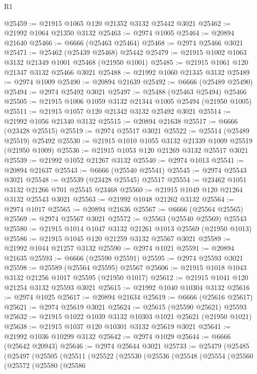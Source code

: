 \begin{lexlean}{R1}
\begin{coremodule}
@25459 := @21915 @1065 @120 @21352 @3132 @25442 @3021
@25462 := @21992 @1064 @21350 @3132
@25463 := @2974 @1005
@25464 := @20894 @21640
@25466 := @6666 (@25463 @25464)
@25468 := @2974 @25466 @3021
@25471 := @25462 (@25439 @25468) @25442
@25479 := @21915 @1002 @1063 @3132 @21349 @1001 @25468 (@21950 @1001)
@25485 := @21915 @1061 @120 @21347 @3132 @25466 @3021
@25488 := @21992 @1060 @21345 @3132
@25489 := @2974 @1009
@25490 := @20894 @21639
@25492 := @6666 (@25489 @25490)
@25494 := @2974 @25492 @3021
@25497 := @25488 (@25463 @25494) @25466
@25505 := @21915 @1006 @1059 @3132 @21344 @1005 @25494 (@21950 @1005)
@25511 := @21915 @1057 @120 @21342 @3132 @25492 @3021
@25514 := @21992 @1056 @21340 @3132
@25515 := @20894 @21638
@25517 := @6666 (@23428 @25515)
@25519 := @2974 @25517 @3021
@25522 := @25514 (@25489 @25519) @25492
@25530 := @21915 @1010 @1055 @3132 @21339 @1009 @25519 (@21950 @1009)
@25536 := @21915 @1053 @120 @21269 @3132 @25517 @3021
@25539 := @21992 @1052 @21267 @3132
@25540 := @2974 @1013
@25541 := @20894 @21637
@25543 := @6666 (@25540 @25541)
@25545 := @2974 @25543 @3021
@25548 := @25539 (@23428 @25545) @25517
@25554 := @23462 @1051 @3132 @21266 @701 @25545 @23468
@25560 := @21915 @1049 @120 @21264 @3132 @25543 @3021
@25563 := @21992 @1048 @21262 @3132
@25564 := @2974 @1017
@25565 := @20894 @21636
@25567 := @6666 (@25564 @25565)
@25569 := @2974 @25567 @3021
@25572 := @25563 (@25540 @25569) @25543
@25580 := @21915 @1014 @1047 @3132 @21261 @1013 @25569 (@21950 @1013)
@25586 := @21915 @1045 @120 @21259 @3132 @25567 @3021
@25589 := @21992 @1044 @21257 @3132
@25590 := @2974 @1021
@25591 := @20894 @21635
@25593 := @6666 (@25590 @25591)
@25595 := @2974 @25593 @3021
@25598 := @25589 (@25564 @25595) @25567
@25606 := @21915 @1018 @1043 @3132 @21256 @1017 @25595 (@21950 @1017)
@25612 := @21915 @1041 @120 @21254 @3132 @25593 @3021
@25615 := @21992 @1040 @10304 @3132
@25616 := @2974 @1025
@25617 := @20894 @21634
@25619 := @6666 (@25616 @25617)
@25621 := @2974 @25619 @3021
@25624 := @25615 (@25590 @25621) @25593
@25632 := @21915 @1022 @1039 @3132 @10303 @1021 @25621 (@21950 @1021)
@25638 := @21915 @1037 @120 @10301 @3132 @25619 @3021
@25641 := @21992 @1036 @10299 @3132
@25642 := @2974 @1029
@25644 := @6666 (@25642 @20943)
@25646 := @2974 @25644 @3021
@25733 := @25479
    (@25485
      (@25497
        (@25505
          (@25511
            (@25522
              (@25530
                (@25536
                  (@25548
                    (@25554
                      (@25560
                        (@25572
                          (@25580
                            (@25586

\end{coremodule}
\end{lexlean}
